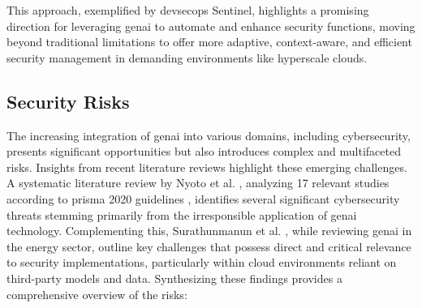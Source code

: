 This approach, exemplified by \gls{devsecops} Sentinel, highlights a promising direction for leveraging \gls{genai} to automate and enhance security functions, moving beyond traditional limitations to offer more adaptive, context-aware, and efficient security management in demanding environments like \gls{hyperscale} clouds.

\subsection{Security Risks} %
\label{sec:Security Risks}

The increasing integration of \gls{genai} into various domains, including cybersecurity, presents significant opportunities but also introduces complex and multifaceted risks. Insights from recent literature reviews highlight these emerging challenges. A systematic literature review by Nyoto et al. \cite{nyoto_cyber_2024}, analyzing 17 relevant studies according to \gls{prisma} 2020 guidelines \cite{page_prisma_2021}, identifies several significant cybersecurity threats stemming primarily from the irresponsible application of \gls{genai} technology. Complementing this, Surathunmanun et al. \cite{surathunmanun_exploring_2024}, while reviewing \gls{genai} in the energy sector, outline key challenges that possess direct and critical relevance to security implementations, particularly within cloud environments reliant on third-party models and data. Synthesizing these findings provides a comprehensive overview of the risks:

